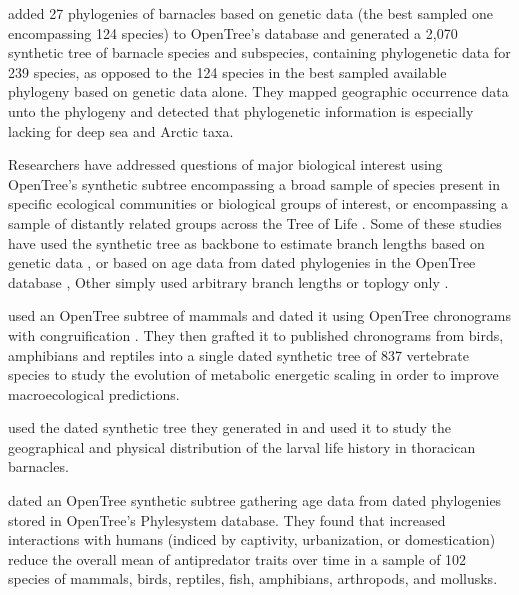 \documentclass[oupdraft]{sysbio_sse}
\begin{document}
\citep{ewers2019towards} added 27 phylogenies of barnacles based on genetic data
(the best sampled one encompassing 124 species) to OpenTree's database and generated
a 2,070 synthetic tree of barnacle species and subspecies, containing phylogenetic
data for 239 species, as opposed to the 124 species in the best sampled available
phylogeny based on genetic data alone. They mapped geographic occurrence data unto
the phylogeny and detected that phylogenetic information is especially lacking for
deep sea and Arctic taxa.

Researchers have addressed questions of major biological interest using OpenTree's
synthetic subtree encompassing a broad sample of species present
in specific ecological communities or biological groups of interest,
or encompassing a sample of distantly related groups across the Tree of Life
\citep{tarka2018sex, healy2019animal, herrera2015predicting, capdevila2020longevity, fisher2017evolution, boeckmann2015quest, uyeda2017evolution}.
Some of these studies have used the synthetic tree as backbone to estimate branch lengths
based on genetic data \citep{allen2019spatial, smith2018constructing}, or based on
age data from dated phylogenies in the OpenTree database \citep{uyeda2017evolution, geffroy2020evolutionary},
Other simply used arbitrary branch lengths \citep{healy2019animal, capdevila2020longevity}
or toplogy only \citep{boeckmann2015quest, fisher2017evolution, herrera2015predicting}.


\citep{uyeda2017evolution} used an OpenTree subtree of mammals and dated it using OpenTree
chronograms with congruification \citep{eastman2013congruification}. They then
grafted it to published chronograms from birds, amphibians
and reptiles into a single dated synthetic tree of 837 vertebrate species to study
the evolution of metabolic energetic scaling in order to improve macroecological predictions.

\citep{ewers2019testing} used the dated synthetic tree they generated in \citep{ewers2019towards}
and used it to study the geographical and physical distribution of the larval life
history in thoracican barnacles.

\citep{geffroy2020evolutionary} dated an OpenTree synthetic subtree gathering age data
from dated phylogenies stored in OpenTree's Phylesystem database. They found that
increased interactions with humans (indiced by captivity, urbanization, or domestication)
reduce the overall mean of antipredator traits over time in a sample of 102 species
of mammals, birds, reptiles, fish, amphibians, arthropods, and mollusks.
\end{document}
